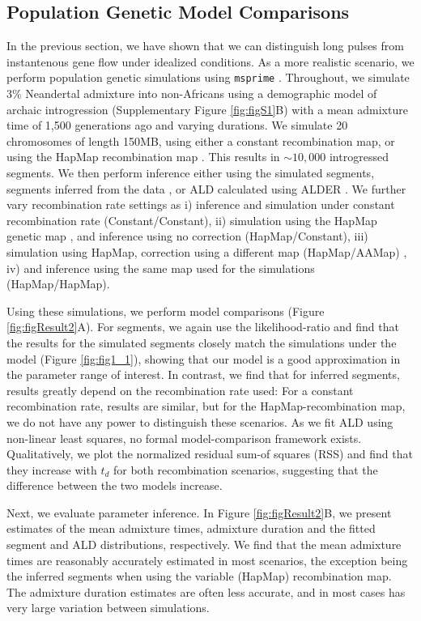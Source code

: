 \documentclass[11pt]{article}
\begin{document}
\subsection{Population Genetic Model Comparisons}\label{Model comparison}
In the previous section, we have shown that we can distinguish long pulses from instantenous gene flow under idealized conditions. As a more realistic scenario, we perform population genetic simulations using  \texttt{msprime}  \citep{kelleher_efficient_2016}. Throughout, we simulate 3\% Neandertal admixture into non-Africans using a demographic model of archaic introgression (Supplementary Figure \ref{fig:figS1}B) with a mean admixture time of 1,500 generations ago and varying durations.  We simulate 20 chromosomes of length 150MB, using either a constant recombination map, or using the HapMap recombination map \citep{HapMapConsortium_second_2007}. This results in $\sim10,000$ introgressed segments. We then perform inference either using the simulated segments, segments inferred from the data \citep{skov_detecting_2018}, or ALD calculated using ALDER \citep{loh_inferring_2013}. We further vary recombination rate settings as i) inference and simulation under constant recombination rate (Constant/Constant), ii) simulation using the HapMap genetic map \citep{HapMapConsortium_second_2007}, and inference using no correction (HapMap/Constant), iii) simulation using HapMap, correction using a different map  (HapMap/AAMap) \citep{hinch_landscape_2011}, iv) and inference using the same map used for the simulations (HapMap/HapMap). 

Using these simulations, we perform  model comparisons (Figure \ref{fig:figResult2}A). For segments, we again use the likelihood-ratio and find that the results for the simulated segments closely match the simulations under the model (Figure \ref{fig:fig1_1}), showing that our model is a good approximation in the parameter range of interest. In contrast, we find that for inferred segments, results greatly depend on the recombination rate used: For a constant recombination rate, results are similar, but for the HapMap-recombination map, we do not have any power to distinguish these scenarios. As we fit ALD using non-linear least squares, no formal model-comparison framework exists. Qualitatively, we plot the normalized residual sum-of squares (RSS) and find that they increase with $t_d$ for both recombination scenarios, suggesting that the difference between the two models increase. 

Next, we evaluate parameter inference. In Figure \ref{fig:figResult2}B, we present estimates of the mean admixture times, admixture duration and the fitted segment and ALD distributions, respectively.  We find that the mean admixture times are reasonably accurately estimated in most scenarios, the exception being the inferred segments when using the variable (HapMap) recombination map. The admixture duration estimates are  often less accurate, and in most cases has very large variation between simulations.
 
\end{document}
